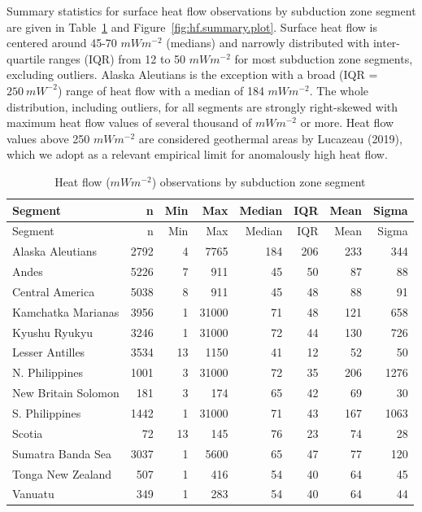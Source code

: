 \documentclass[draft,linenumbers]{agujournal2018}
\begin{document}
Summary statistics for surface heat flow observations by subduction zone
segment are given in Table~\ref{tbl:hf.summary.table} and
Figure~\ref{fig:hf.summary.plot}. Surface heat flow is centered around
45-70 \(mWm^{-2}\) (medians) and narrowly distributed with
inter-quartile ranges (IQR) from 12 to 50 \(mWm^{-2}\) for most
subduction zone segments, excluding outliers. Alaska Aleutians is the
exception with a broad (IQR = \(250~mW^{-2}\)) range of heat flow with a
median of 184 \(mWm^{-2}\). The whole distribution, including outliers,
for all segments are strongly right-skewed with maximum heat flow values
of several thousand of \(mWm^{-2}\) or more. Heat flow values above 250
\(mWm^{-2}\) are considered geothermal areas by Lucazeau (2019), which
we adopt as a relevant empirical limit for anomalously high heat flow.

\hypertarget{tbl:hf.summary.table}{}
\begin{longtable}[]{@{}lrrrrrrr@{}}
\caption{\label{tbl:hf.summary.table}Heat flow (\(mWm^{-2}\))
observations by subduction zone segment}\tabularnewline
\toprule
Segment & n & Min & Max & Median & IQR & Mean & Sigma \\
\midrule
\endfirsthead
\toprule
Segment & n & Min & Max & Median & IQR & Mean & Sigma \\
\midrule
\endhead
Alaska Aleutians & 2792 & 4 & 7765 & 184 & 206 & 233 & 344 \\
Andes & 5226 & 7 & 911 & 45 & 50 & 87 & 88 \\
Central America & 5038 & 8 & 911 & 45 & 48 & 88 & 91 \\
Kamchatka Marianas & 3956 & 1 & 31000 & 71 & 48 & 121 & 658 \\
Kyushu Ryukyu & 3246 & 1 & 31000 & 72 & 44 & 130 & 726 \\
Lesser Antilles & 3534 & 13 & 1150 & 41 & 12 & 52 & 50 \\
N. Philippines & 1001 & 3 & 31000 & 72 & 35 & 206 & 1276 \\
New Britain Solomon & 181 & 3 & 174 & 65 & 42 & 69 & 30 \\
S. Philippines & 1442 & 1 & 31000 & 71 & 43 & 167 & 1063 \\
Scotia & 72 & 13 & 145 & 76 & 23 & 74 & 28 \\
Sumatra Banda Sea & 3037 & 1 & 5600 & 65 & 47 & 77 & 120 \\
Tonga New Zealand & 507 & 1 & 416 & 54 & 40 & 64 & 45 \\
Vanuatu & 349 & 1 & 283 & 54 & 40 & 64 & 44 \\
\bottomrule
\end{longtable}
\end{document}
